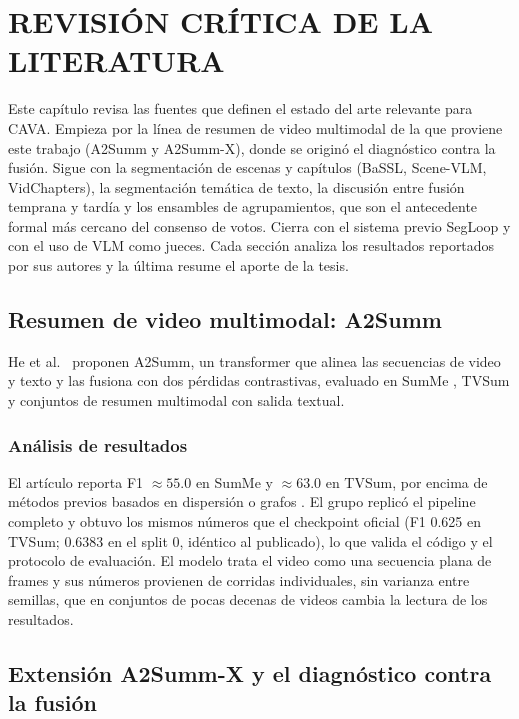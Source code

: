 \chapter{REVISIÓN CRÍTICA DE LA LITERATURA}

Este capítulo revisa las fuentes que definen el estado del arte relevante para CAVA. Empieza
por la línea de resumen de video multimodal de la que proviene este trabajo (A2Summ y
A2Summ-X), donde se originó el diagnóstico contra la fusión. Sigue con la segmentación de
escenas y capítulos (BaSSL, Scene-VLM, VidChapters), la segmentación temática de texto, la
discusión entre fusión temprana y tardía y los ensambles de agrupamientos, que son el
antecedente formal más cercano del consenso de votos. Cierra con el sistema previo SegLoop y
con el uso de VLM como jueces. Cada sección analiza los resultados reportados por sus autores
y la última resume el aporte de la tesis.

\section{Resumen de video multimodal: A2Summ}

He et al.\ \cite{he2023a2summ} proponen A2Summ, un transformer que alinea las secuencias de
video y texto y las fusiona con dos pérdidas contrastivas, evaluado en SumMe
\cite{gygli2014summe}, TVSum \cite{song2015tvsum} y conjuntos de resumen multimodal con
salida textual.

\subsection{Análisis de resultados}
El artículo reporta F1 $\approx 55.0$ en SumMe y $\approx 63.0$ en TVSum, por encima de
métodos previos basados en dispersión o grafos \cite{chu2018spell}. El grupo replicó el
pipeline completo y obtuvo los mismos números que el checkpoint oficial (F1 0.625 en TVSum;
0.6383 en el split 0, idéntico al publicado), lo que valida el código y el protocolo de
evaluación. El modelo trata el video como una secuencia plana de frames y sus números
provienen de corridas individuales, sin varianza entre semillas, que en conjuntos de pocas
decenas de videos cambia la lectura de los resultados.

\section{Extensión A2Summ-X y el diagnóstico contra la fusión}

